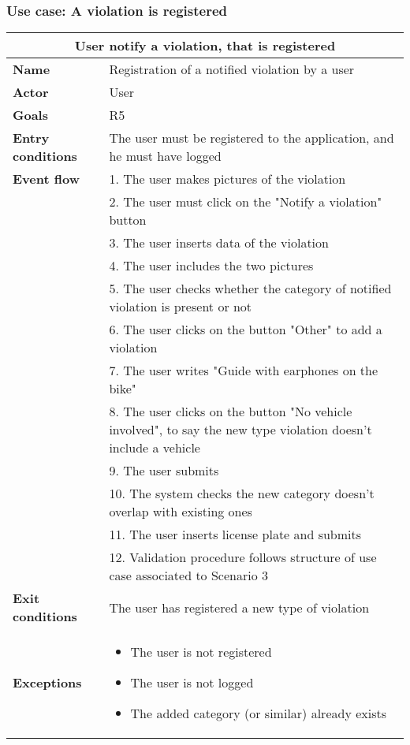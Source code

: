 \subsubsection{Use case: A violation is registered}
\begin{center}
    \begin{tabular}{|p{3cm}|p{7cm}|}
        \multicolumn{2}{c}{\textbf{User notify a violation, that is registered}} \\
        \hline
        \textbf{Name} & Registration of a notified violation by a user \\
        \hline
        \textbf{Actor} & User \\
        \hline
        \textbf{Goals} & R5 \\
        \hline
        \textbf{Entry conditions} & The user must be registered to the application, and he must have logged \\
        \hline
        \textbf{Event flow} & 1. The user makes pictures of the violation \\ 
        & 2. The user must click on the "Notify a violation" button \\ 
        & 3. The user inserts data of the violation\\
        & 4. The user includes the two pictures \\
        & 5. The user checks whether the category of notified violation is present or not \\ 
        & 6. The user clicks on the button "Other" to add a violation \\
        & 7. The user writes "Guide with earphones on the bike" \\
        & 8. The user clicks on the button "No vehicle involved", to say the new type violation doesn't include a vehicle \\
        & 9. The user submits \\ 
        & 10. The system checks the new category doesn't overlap with existing ones \\
        & 11. The user inserts license plate and submits \\
        & 12. Validation procedure follows structure of use case associated to Scenario 3 \\
        \hline
        \textbf{Exit conditions} & The user has registered a new type of violation \\
        \hline
        \textbf{Exceptions}
        & \begin{itemize}
            \item The user is not registered
            \item The user is not logged
            \item The added category (or similar) already exists
        \end{itemize} \\
        \hline
    \end{tabular}
\end{center}

